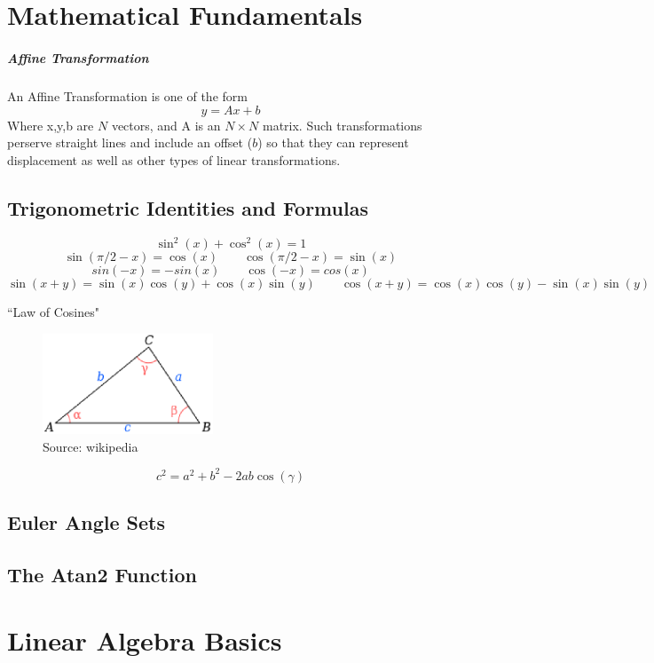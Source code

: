 
\chapter{Mathematical Fundamentals}

\paragraph{Affine Transformation}
An Affine Transformation is one of the form
\[
y = Ax + b
\]
Where x,y,b are $N$ vectors, and A is an $N\times N$  matrix.  Such transformations perserve straight lines and include an offset ($b$) so that they can represent displacement as well as other types of linear transformations.


\section{Trigonometric Identities and Formulas}

\[
\sin^2(x)  + \cos^2(x) = 1
\]
\[
\sin(\pi/2-x) = \cos(x) \qquad \cos(\pi/2-x) = \sin(x)
\]
\[
sin(-x) = - sin(x) \qquad \cos(-x) = cos(x)
\]
\[
\sin(x+y) = \sin(x)\cos(y)+\cos(x)\sin(y) \qquad \cos(x+y) = \cos(x)\cos(y) -\sin(x)\sin(y)
\]

``Law of Cosines"
\begin{figure}
\includegraphics[width=2.0in]{figs_apdx/triangle.eps}
\caption{Source: wikipedia}
\end{figure}
\[
c^2 = a^2+b^2-2ab\cos(\gamma)
\]
\section{Euler Angle Sets}
\section{The Atan2 Function}

\newpage
\chapter{Linear Algebra Basics}\label{LinearAlgebraBasics}

